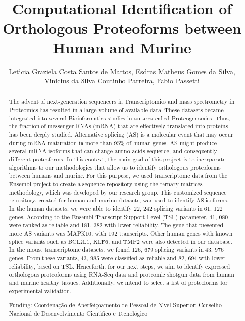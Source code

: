 \documentclass[twoside]{article}
\title{\vspace{-15mm}\fontsize{24pt}{10pt}\selectfont\textbf{ Computational Identification of Orthologous Proteoforms between Human and Murine }} %
\author{ Let\'{\i}cia Graziela Costa Santos de Mattos, Esdras Matheus Gomes da Silva, Vinicius da Silva Coutinho Parreira, Fabio Passetti }
\affil{ Laboratory of Gene Expression Regulation,  Carlos Chagas Institute,  Funda\c{c}\~ao Oswaldo Cruz (Fiocruz),  Curitiba,  PR,  Brazil }
\date{}
\begin{document}
  
  
  \maketitle %
  
  
  \thispagestyle{fancy} %
  
  
  \begin{abstract}
  The advent of next-generation sequencers in Transcriptomics and mass spectrometry in Proteomics has resulted in a large volume of available data. These datasets became integrated into several Bioinformatics studies in an area called Proteogenomics. Thus,  the fraction of messenger RNAs (mRNA) that are effectively translated into proteins has been deeply studied. Alternative splicing (AS) is a molecular event that may occur during mRNA maturation in more than 95\% of human genes. AS might produce several mRNA isoforms that can change amino acids sequence,  and consequently different proteoforms. In this context,  the main goal of this project is to incorporate algorithms to our methodologies that allow us to identify orthologous proteoforms between humans and murine. For this purpose,  we used transcriptome data from the Ensembl project to create a sequence repository using the ternary matrices methodology,  which was developed by our research group. This customized sequence repository,  created for human and murine datasets,  was used to identify AS isoforms. In the human datasets,  we were able to identify 22, 242 splicing variants in 61, 122 genes. According to the Ensembl Transcript Support Level (TSL) parameter,  41, 080 were ranked as reliable and 181, 382 with lower reliability. The gene that presented more AS variants was MAPK10,  with 192 transcripts. Other human genes with known splice variants such as BCL2L1,  KLF6,  and TMP2 were also detected in our database. In the mouse transcriptome datasets,  we found 126, 679 splicing variants in 43, 976 genes. From these variants,  43, 985 were classified as reliable and 82, 694 with lower reliability,  based on TSL. Henceforth,  for our next steps,  we aim to identify expressed orthologous proteoforms using RNA-Seq data and proteomic shotgun data from human and murine healthy tissues. Additionally,  we intend to select a list of proteoforms for experimental validation.
  
  Funding: Coordena\c{c}\~ao de Aperfei\c{c}oamento de Pessoal de N\'{\i}vel Superior; Conselho Nacional de Desenvolvimento Cient\'{\i}fico e Tecnol\'ogico \\ 
  \end{abstract}
  
\end{document}
